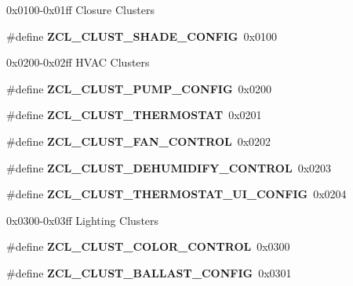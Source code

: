 \label{_amgrp01747264fe7bf50731df0522c351974e}%
0x0100-\/0x01ff Closure Clusters \begin{DoxyCompactItemize}
\item 
\mbox{\label{group__zcl_ga72f0565da3072ed47f56ba4a5f21ab65}} 
\#define {\bfseries Z\+C\+L\+\_\+\+C\+L\+U\+S\+T\+\_\+\+S\+H\+A\+D\+E\+\_\+\+C\+O\+N\+F\+IG}~0x0100
\end{DoxyCompactItemize}
\label{_amgrp01747264fe7bf50731df0522c351974e}%
0x0200-\/0x02ff H\+V\+AC Clusters \begin{DoxyCompactItemize}
\item 
\mbox{\label{group__zcl_ga498ed423dfc4bdfec0fd83ce47f2f0f3}} 
\#define {\bfseries Z\+C\+L\+\_\+\+C\+L\+U\+S\+T\+\_\+\+P\+U\+M\+P\+\_\+\+C\+O\+N\+F\+IG}~0x0200
\item 
\mbox{\label{group__zcl_gaad276e851819eb0847930b299b886029}} 
\#define {\bfseries Z\+C\+L\+\_\+\+C\+L\+U\+S\+T\+\_\+\+T\+H\+E\+R\+M\+O\+S\+T\+AT}~0x0201
\item 
\mbox{\label{group__zcl_ga472e1fc64714dc49510922fc3012c6df}} 
\#define {\bfseries Z\+C\+L\+\_\+\+C\+L\+U\+S\+T\+\_\+\+F\+A\+N\+\_\+\+C\+O\+N\+T\+R\+OL}~0x0202
\item 
\mbox{\label{group__zcl_gaa5b947e5e872b25c8779ad332cd827d2}} 
\#define {\bfseries Z\+C\+L\+\_\+\+C\+L\+U\+S\+T\+\_\+\+D\+E\+H\+U\+M\+I\+D\+I\+F\+Y\+\_\+\+C\+O\+N\+T\+R\+OL}~0x0203
\item 
\mbox{\label{group__zcl_ga62cebc179e8588411483c047dbd56476}} 
\#define {\bfseries Z\+C\+L\+\_\+\+C\+L\+U\+S\+T\+\_\+\+T\+H\+E\+R\+M\+O\+S\+T\+A\+T\+\_\+\+U\+I\+\_\+\+C\+O\+N\+F\+IG}~0x0204
\end{DoxyCompactItemize}
\label{_amgrp01747264fe7bf50731df0522c351974e}%
0x0300-\/0x03ff Lighting Clusters \begin{DoxyCompactItemize}
\item 
\mbox{\label{group__zcl_ga9d7f67c80b4ee0fc4c1d216d72eb1d21}} 
\#define {\bfseries Z\+C\+L\+\_\+\+C\+L\+U\+S\+T\+\_\+\+C\+O\+L\+O\+R\+\_\+\+C\+O\+N\+T\+R\+OL}~0x0300
\item 
\mbox{\label{group__zcl_ga5422419fb816668fc07ccdd5d630fea1}} 
\#define {\bfseries Z\+C\+L\+\_\+\+C\+L\+U\+S\+T\+\_\+\+B\+A\+L\+L\+A\+S\+T\+\_\+\+C\+O\+N\+F\+IG}~0x0301
\end{DoxyCompactItemize}
